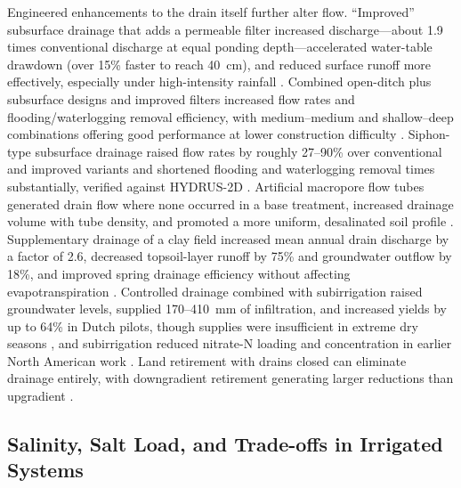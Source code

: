 \documentclass[11pt]{article}
\begin{document}
Engineered enhancements to the drain itself further alter flow. ``Improved''
subsurface drainage that adds a permeable filter increased discharge---about 1.9
times conventional discharge at equal ponding depth---accelerated water-table
drawdown (over 15\% faster to reach 40~cm), and reduced surface runoff more
effectively, especially under high-intensity rainfall
\parencite{Tao2016,Tao2017}. Combined open-ditch plus subsurface designs and
improved filters increased flow rates and flooding/waterlogging removal
efficiency, with medium--medium and shallow--deep combinations offering good
performance at lower construction difficulty \parencite{Ren2021,Tao2025}.
Siphon-type subsurface drainage raised flow rates by roughly 27--90\% over
conventional and improved variants and shortened flooding and waterlogging
removal times substantially, verified against HYDRUS-2D
\parencite{Ren2023}. Artificial macropore flow tubes generated drain flow where
none occurred in a base treatment, increased drainage volume with tube density,
and promoted a more uniform, desalinated soil profile \parencite{Chen2021}.
Supplementary drainage of a clay field increased mean annual drain discharge by
a factor of 2.6, decreased topsoil-layer runoff by 75\% and groundwater outflow
by 18\%, and improved spring drainage efficiency without affecting
evapotranspiration \parencite{Häggblom2019}. Controlled drainage combined with
subirrigation raised groundwater levels, supplied 170--410~mm of infiltration,
and increased yields by up to 64\% in Dutch pilots, though supplies were
insufficient in extreme dry seasons \parencite{deWit2022,deWit2024}, and
subirrigation reduced nitrate-N loading and concentration in earlier North
American work \parencite{FAUSEY1995,Almen2021,Madramootoo2007}. Land retirement
with drains closed can eliminate drainage entirely, with downgradient retirement
generating larger reductions than upgradient \parencite{Purkey2001}.

\subsection{Salinity, Salt Load, and Trade-offs in Irrigated Systems}
\end{document}
